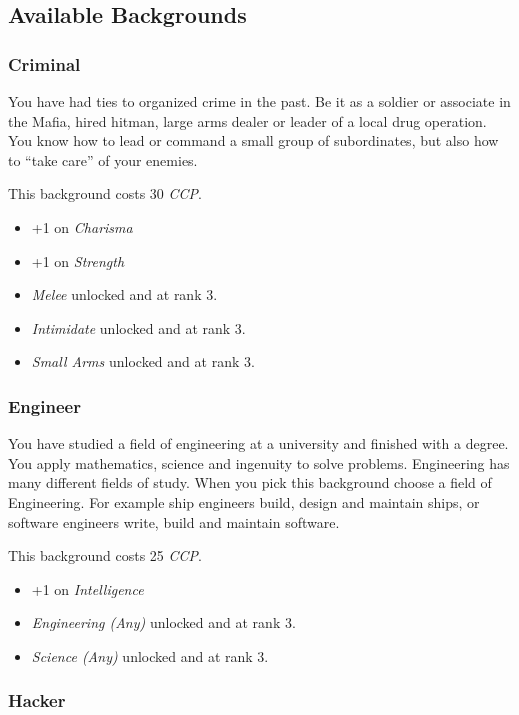 \subsection{Available Backgrounds}

\subsubsection{Criminal}

You have had ties to organized crime in the past. Be it as a soldier or
associate in the Mafia, hired hitman, large arms dealer or leader of a
local drug operation. You know how to lead or command a small group of
subordinates, but also how to ``take care'' of your enemies.

This background costs 30 \emph{CCP}.

\begin{itemize}
\item +1 on \emph{Charisma}
\item +1 on \emph{Strength}
\item \emph{Melee} unlocked and at rank 3.
\item \emph{Intimidate} unlocked and at rank 3.
\item \emph{Small Arms} unlocked and at rank 3.
\end{itemize}

\subsubsection{Engineer}

You have studied a field of engineering at a university and finished with
a degree. You apply mathematics, science and ingenuity to solve problems.
Engineering has many different fields of study. When you pick this background
choose a field of Engineering. For example ship engineers build, design and
maintain ships, or software engineers write, build and maintain software.

This background costs 25 \emph{CCP}.

\begin{itemize}
\item +1 on \emph{Intelligence}
\item \emph{Engineering (Any)} unlocked and at rank 3.
\item \emph{Science (Any)} unlocked and at rank 3.
\end{itemize}

\subsubsection{Hacker}

